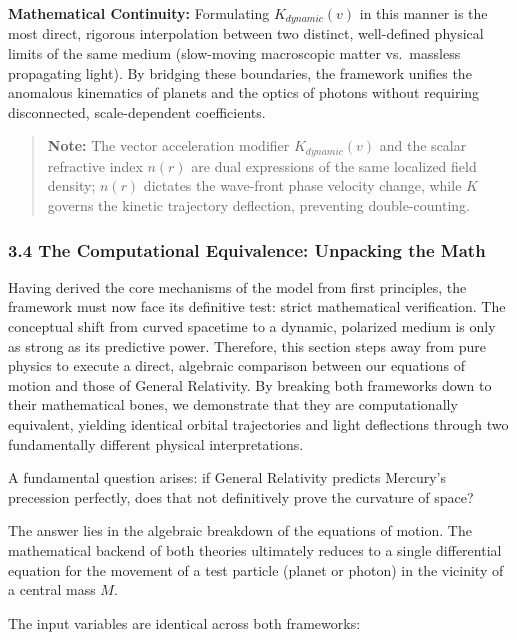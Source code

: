 \documentclass[
]{article}
\begin{document}
\textbf{Mathematical Continuity:} Formulating \(K_{dynamic}(v)\) in this
manner is the most direct, rigorous interpolation between two distinct,
well-defined physical limits of the same medium (slow-moving macroscopic
matter vs.~massless propagating light). By bridging these boundaries,
the framework unifies the anomalous kinematics of planets and the optics
of photons without requiring disconnected, scale-dependent coefficients.

\begin{quote}
\textbf{Note:} The vector acceleration modifier \(K_{dynamic}(v)\) and
the scalar refractive index \(n(r)\) are dual expressions of the same
localized field density; \(n(r)\) dictates the wave-front phase velocity
change, while \(K\) governs the kinetic trajectory deflection,
preventing double-counting.
\end{quote}

\subsubsection{3.4 The Computational Equivalence: Unpacking the
Math}\label{the-computational-equivalence-unpacking-the-math}

Having derived the core mechanisms of the model from first principles,
the framework must now face its definitive test: strict mathematical
verification. The conceptual shift from curved spacetime to a dynamic,
polarized medium is only as strong as its predictive power. Therefore,
this section steps away from pure physics to execute a direct, algebraic
comparison between our equations of motion and those of General
Relativity. By breaking both frameworks down to their mathematical
bones, we demonstrate that they are computationally equivalent, yielding
identical orbital trajectories and light deflections through two
fundamentally different physical interpretations.

A fundamental question arises: if General Relativity predicts Mercury's
precession perfectly, does that not definitively prove the curvature of
space?

The answer lies in the algebraic breakdown of the equations of motion.
The mathematical backend of both theories ultimately reduces to a single
differential equation for the movement of a test particle (planet or
photon) in the vicinity of a central mass \(M\).

The input variables are identical across both frameworks:
\end{document}
